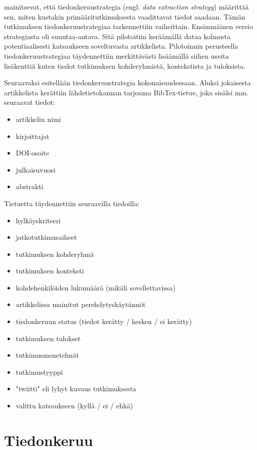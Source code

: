 \documentclass[utf8]{gradu3}
\begin{document}
\textcite{kitchenham-charters-2007} mainitsevat, että tiedonkeruustrategia (engl. \textit{data extraction strategy}) määrittää sen, miten kustakin primääritutkimuksesta vaadittavat tiedot saadaan. Tämän tutkimuksen tiedonkeruustrategiaa tarkennettiin vaiheittain. Ensimmäinen versio strategiasta oli suuntaa-antava. Sitä pilotoitiin keräämällä dataa kolmesta potentiaalisesti katsaukseen soveltuvasta artikkelista. Pilotoinnin perusteella tiedonkeruustrategiaa täydennettiin merkittävästi lisäämällä siihen useita lisäkenttiä kuten tiedot tutkimuksen kohderyhmistä, kontekstista ja tuloksista.

Seuraavaksi esitellään tiedonkeruustrategia kokonaisuudessaan. Aluksi jokaisesta artikkelista kerättiin lähdetietokannan tarjoama BibTex-tietue, joka sisälsi mm. seuraavat tiedot:

\begin{itemize}
    \item artikkelin nimi
    \item kirjoittajat
    \item DOI-osoite
    \item julkaisuvuosi
    \item abstrakti
\end{itemize}

Tietuetta täydennettiin seuraavilla tiedoilla:

\begin{itemize}
    \item hylkäyskriteeri
    \item jatkotutkimusaiheet
    \item tutkimuksen kohderyhmä
    \item tutkimuksen konteksti
    \item kohdehenkilöiden lukumäärä (mikäli sovellettavissa)
    \item artikkelissa mainitut perehdytyskäytännöt
    \item tiedonkeruun status (tiedot kerätty / kesken / ei kerätty)
    \item tutkimuksen tulokset
    \item tutkimusmenetelmät
    \item tutkimustyyppi
    \item "twiitti" eli lyhyt kuvaus tutkimuksesta
    \item valittu katsaukseen (kyllä / ei / ehkä)
\end{itemize}

\section{Tiedonkeruu}
\end{document}
